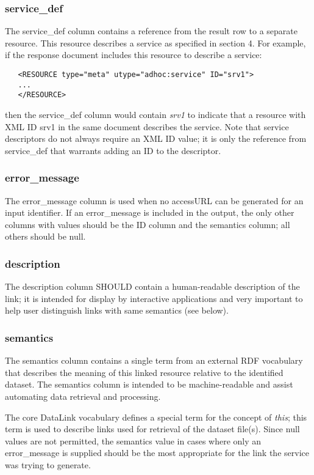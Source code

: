 \documentclass[11pt,a4paper]{ivoa}
\begin{document}
\subsubsection{service\_def}

The service\_def column contains a reference from the result row to
a separate resource. This resource describes a service as specified
in section 4.
For example, if the response document includes this resource
to describe a service:
\begin{verbatim}
   <RESOURCE type="meta" utype="adhoc:service" ID="srv1">
   ...
   </RESOURCE>
\end{verbatim}
then the service\_def column would contain {\em srv1\/} to indicate that
a resource with XML ID srv1 in the same document describes the service.
Note that service descriptors do not always require an XML ID value;
it is only the reference from service\_def that warrants adding
an ID to the descriptor.


\subsubsection{error\_message}

The error\_message column is used when no accessURL can be generated for
an input identifier. If an error\_message is included in the output, the
only other columns with values should be the ID column and the semantics
column; all others should be null.


\subsubsection{description}

The description column SHOULD contain a human-readable description of
the link; it is intended for display by interactive applications and very
important to help user distinguish links with same semantics (see below).


\subsubsection{semantics}

The semantics column contains a single term from an external RDF
vocabulary that describes the meaning of this linked resource relative
to the identified dataset. The semantics column is intended to be
machine-readable and assist automating data retrieval and processing.

The core DataLink vocabulary defines a special term for
the concept of {\em this\/};
this term is used to describe links used for retrieval of the
dataset file(s). Since null values are not permitted, the semantics
value in cases where only an error\_message is supplied should be the
most appropriate for the link the service was trying to generate.
\end{document}
